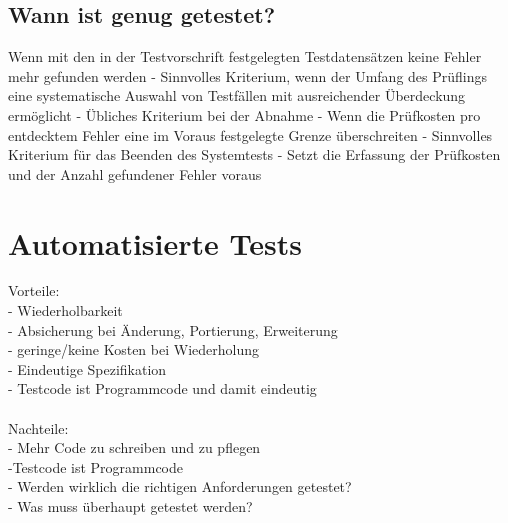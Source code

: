 \subsection{Wann ist genug getestet?}
 Wenn mit den in der Testvorschrift festgelegten Testdatensätzen keine Fehler mehr gefunden 
werden
- Sinnvolles Kriterium, wenn der Umfang des Prüflings eine systematische Auswahl von Testfällen mit 
ausreichender Überdeckung ermöglicht
- Übliches Kriterium bei der Abnahme
- Wenn die Prüfkosten pro entdecktem Fehler eine im Voraus festgelegte Grenze überschreiten
- Sinnvolles Kriterium für das Beenden des Systemtests
- Setzt die Erfassung der Prüfkosten und der Anzahl gefundener Fehler voraus

\section{Automatisierte Tests}
\begin{multicols}{2}
Vorteile: \\
- Wiederholbarkeit \\
- Absicherung bei Änderung, Portierung, Erweiterung \\
- geringe/keine Kosten bei Wiederholung  \\
- Eindeutige Spezifikation \\
- Testcode ist Programmcode und damit eindeutig \\
	\columnbreak
	\\
Nachteile: \\
- Mehr Code zu schreiben und zu pflegen \\
-Testcode ist Programmcode \\
- Werden wirklich die richtigen Anforderungen getestet? \\
- Was muss überhaupt getestet werden? \\
\end{multicols}



